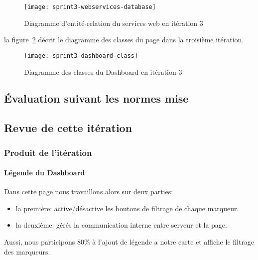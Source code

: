 \begin{figure}[htbp]
    \centering
    \texttt{[image: sprint3-webservices-database]}
    \caption{Diagramme d'entité-relation du services web en itération 3}
    \label{fig:sprint3-webservices-database}
\end{figure}

la figure~\ref{fig:sprint3-dashboard-classs} décrit le diagramme des classes du
page  dans la troisième itération.

\begin{figure}[htbp]
    \centering
    \texttt{[image: sprint3-dashboard-class]}
    \caption{Diagramme des classes du Dashboard en itération 3}
    \label{fig:sprint3-dashboard-classs}
\end{figure}

\subsection{Évaluation suivant les normes mise}

\TODO{}

\subsection{Revue de cette itération}


\subsubsection{Produit de l'itération}

\paragraph{Légende du Dashboard}
Dans cette page nous travaillons alors sur deux parties:

\begin{itemize}
    \item la première: active/désactive les boutons de filtrage de chaque
        marqueur.
    \item la deuxième: gérés la communication interne entre serveur et la page.
\end{itemize}

Aussi, nous participons 80\% à l'ajout de légende a notre carte et affiche le
filtrage des marqueurs.

